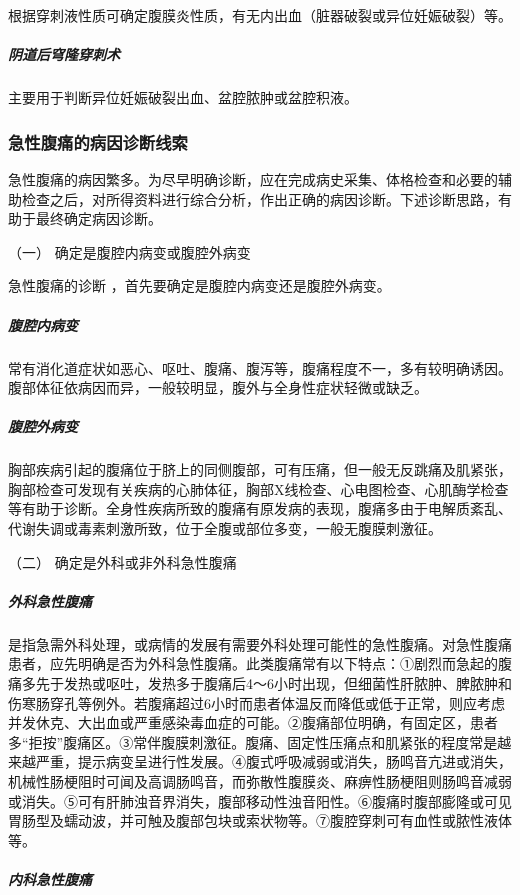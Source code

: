 根据穿刺液性质可确定腹膜炎性质，有无内出血（脏器破裂或异位妊娠破裂）等。

\subparagraph{阴道后穹隆穿刺术}

主要用于判断异位妊娠破裂出血、盆腔脓肿或盆腔积液。

\subsubsection{急性腹痛的病因诊断线索}

急性腹痛的病因繁多。为尽早明确诊断，应在完成病史采集、体格检查和必要的辅助检查之后，对所得资料进行综合分析，作出正确的病因诊断。下述诊断思路，有助于最终确定病因诊断。

\hypertarget{text00026.htmlux5cux23CHP1-10-2-3-1}{}
（一） 确定是腹腔内病变或腹腔外病变

急性腹痛的诊断 ，首先要确定是腹腔内病变还是腹腔外病变。

\subparagraph{腹腔内病变}

常有消化道症状如恶心、呕吐、腹痛、腹泻等，腹痛程度不一，多有较明确诱因。腹部体征依病因而异，一般较明显，腹外与全身性症状轻微或缺乏。

\subparagraph{腹腔外病变}

胸部疾病引起的腹痛位于脐上的同侧腹部，可有压痛，但一般无反跳痛及肌紧张，胸部检查可发现有关疾病的心肺体征，胸部X线检查、心电图检查、心肌酶学检查等有助于诊断。全身性疾病所致的腹痛有原发病的表现，腹痛多由于电解质紊乱、代谢失调或毒素刺激所致，位于全腹或部位多变，一般无腹膜刺激征。

\hypertarget{text00026.htmlux5cux23CHP1-10-2-3-2}{}
（二） 确定是外科或非外科急性腹痛

\subparagraph{外科急性腹痛}

是指急需外科处理，或病情的发展有需要外科处理可能性的急性腹痛。对急性腹痛患者，应先明确是否为外科急性腹痛。此类腹痛常有以下特点：①剧烈而急起的腹痛多先于发热或呕吐，发热多于腹痛后4～6小时出现，但细菌性肝脓肿、脾脓肿和伤寒肠穿孔等例外。若腹痛超过6小时而患者体温反而降低或低于正常，则应考虑并发休克、大出血或严重感染毒血症的可能。②腹痛部位明确，有固定区，患者多“拒按”腹痛区。③常伴腹膜刺激征。腹痛、固定性压痛点和肌紧张的程度常是越来越严重，提示病变呈进行性发展。④腹式呼吸减弱或消失，肠鸣音亢进或消失，机械性肠梗阻时可闻及高调肠鸣音，而弥散性腹膜炎、麻痹性肠梗阻则肠鸣音减弱或消失。⑤可有肝肺浊音界消失，腹部移动性浊音阳性。⑥腹痛时腹部膨隆或可见胃肠型及蠕动波，并可触及腹部包块或索状物等。⑦腹腔穿刺可有血性或脓性液体等。

\subparagraph{内科急性腹痛}

